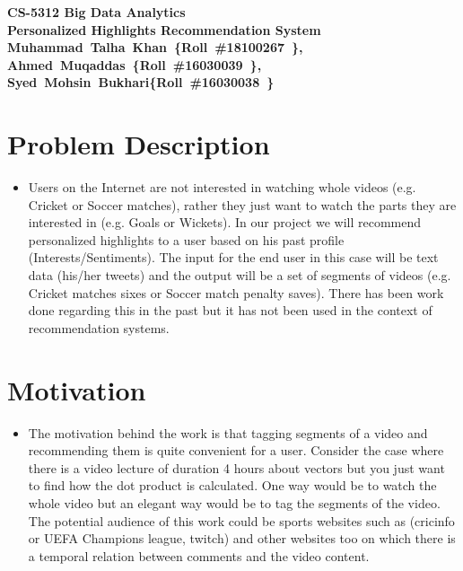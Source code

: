 \documentclass[11pt]{article}
\begin{document}
	{
		\begin{center}
			{\LARGE \bf CS-5312 Big Data Analytics}\\
			{ \Large \bf Personalized Highlights Recommendation System}\\
			{\large \bf \mbox{Muhammad Talha Khan \{Roll \#18100267 \}}, \mbox{Ahmed Muqaddas \{Roll \#16030039 \}}, \mbox{Syed Mohsin Bukhari\{Roll \#16030038 \}}}
		\end{center}
	}

\section{Problem Description}
\begin{itemize}
\item Users on the Internet are not interested in watching whole videos (e.g. Cricket or Soccer matches), rather they just want to watch the parts they are interested in (e.g. Goals or Wickets). In our project we will recommend personalized highlights to a user based on his past profile (Interests/Sentiments). The input for the end user in this case will be text data (his/her tweets) and the output will be  a set of segments of videos (e.g. Cricket matches sixes or Soccer match penalty saves). There has been work done regarding this in the past but it has not been used in the context of recommendation systems.
\end{itemize}

\section{Motivation}
\begin{itemize}
\item The motivation behind the work is that tagging segments of a video and recommending them is quite convenient for a user. Consider the case where there is a video lecture of duration 4 hours about vectors but you just want to find how the dot product is calculated. One way would be to watch the whole video but an elegant way would be to tag the segments of the video. The potential audience of this work could be sports websites such as (cricinfo or UEFA Champions league, twitch) and other websites too on which there is a temporal relation between comments and the video content.
\end{itemize}
\end{document}
